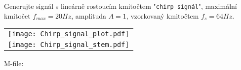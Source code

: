 \begin{mdframed}[style=mdexam]
\begin{example}
  Generujte signál s lineárně rostoucím kmitočtem "\texttt{chirp signál}", maximální kmitočet
  $f_{max} = 20 Hz$, amplituda $A = 1$, vzorkovaný kmitočtem $f_s = 64 Hz$.

    {\centering
    \captionsetup{type=figure}
     \begin{tabular}{c}
         \texttt{[image: Chirp\_signal\_plot.pdf]}  \\
         \texttt{[image: Chirp\_signal\_stem.pdf]} 
     \end{tabular}  
  \par}
  
  M-file:
  
\end{example}
\end{mdframed}